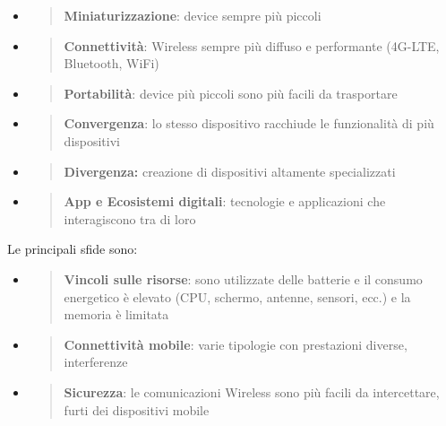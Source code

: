 \begin{itemize}
\item
  \begin{quote}
  \textbf{Miniaturizzazione}: device sempre più piccoli
  \end{quote}
\item
  \begin{quote}
  \textbf{Connettività}: Wireless sempre più diffuso e performante
  (4G-LTE, Bluetooth, WiFi)
  \end{quote}
\item
  \begin{quote}
  \textbf{Portabilità}: device più piccoli sono più facili da
  trasportare
  \end{quote}
\item
  \begin{quote}
  \textbf{Convergenza}: lo stesso dispositivo racchiude le funzionalità
  di più dispositivi
  \end{quote}
\item
  \begin{quote}
  \textbf{Divergenza:} creazione di dispositivi altamente specializzati
  \end{quote}
\item
  \begin{quote}
  \textbf{App e Ecosistemi digitali}: tecnologie e applicazioni che
  interagiscono tra di loro
  \end{quote}
\end{itemize}

Le principali sfide sono:

\begin{itemize}
\item
  \begin{quote}
  \textbf{Vincoli sulle risorse}: sono utilizzate delle batterie e il
  consumo energetico è elevato (CPU, schermo, antenne, sensori, ecc.) e
  la memoria è limitata
  \end{quote}
\item
  \begin{quote}
  \textbf{Connettività mobile}: varie tipologie con prestazioni diverse,
  interferenze
  \end{quote}
\item
  \begin{quote}
  \textbf{Sicurezza}: le comunicazioni Wireless sono più facili da
  intercettare, furti dei dispositivi mobile
  \end{quote}
\end{itemize}

